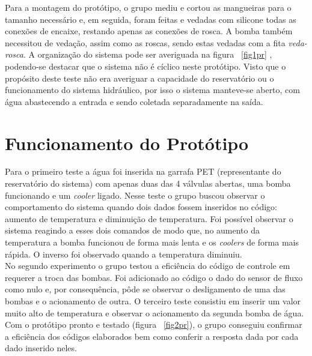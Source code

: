 \newpage
Para a montagem do protótipo, o grupo mediu e cortou as mangueiras para o tamanho necessário e, em seguida, foram feitas e vedadas com silicone todas as conexões de encaixe, restando apenas as conexões de rosca. A bomba também necessitou de vedação, assim como as roscas, sendo estas vedadas com a fita \emph{veda-rosca}. A organização do sistema pode ser averiguada na figura ~\ref{fig1pr} , podendo-se destacar que o sistema não é cíclico neste protótipo. Visto que o propósito deste teste não era averiguar a capacidade do reservatório ou o funcionamento do sistema hidráulico, por isso o sistema manteve-se aberto, com água abastecendo a entrada e sendo coletada separadamente na saída.
\section{Funcionamento do Protótipo}
Para o primeiro teste a água foi inserida na garrafa PET (representante do reservatório do sistema) com apenas duas das 4 válvulas abertas, uma bomba funcionando e um \textit{cooler} ligado. Nesse teste o grupo buscou observar o comportamento do sistema quando dois dados fossem inseridos no código: aumento de temperatura e diminuição de temperatura. Foi possível observar o sistema reagindo a esses dois comandos de modo que, no aumento da temperatura a bomba funcionou de forma mais lenta e os \textit{coolers} de forma mais rápida. O inverso foi observado quando a temperatura diminuiu.\\
No segundo experimento o grupo testou a eficiência do código de controle em requerer a troca das bombas. Foi adicionado ao código o dado do sensor de fluxo como nulo e, por consequência, pôde se observar o desligamento de uma das bombas e o acionamento de outra.  
O terceiro teste consistiu em inserir um valor muito alto de temperatura e observar o acionamento da segunda bomba de água.\\
Com o protótipo pronto e testado (figura ~\ref{fig2pr}), o grupo conseguiu confirmar a eficiência dos códigos elaborados bem como conferir a resposta dada por cada dado inserido neles.
